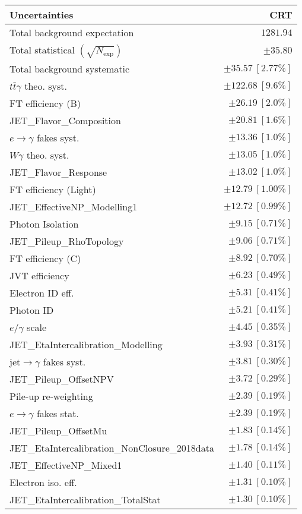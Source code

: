 \begin{tabular}{lr}
\hline
\textbf{Uncertainties} & \textbf{CRT} \\
\hline
Total background expectation & $1281.94$ \\
\hline
Total statistical $(\sqrt{N_\mathrm{exp}})$ & $\pm 35.80$ \\
Total background systematic & $\pm 35.57\ [2.77\%]$ \\
\hline
\hline
$t\bar{t}\gamma$ theo. syst. & $\pm 122.68\ [9.6\%]$ \\
FT efficiency (B) & $\pm 26.19\ [2.0\%]$ \\
JET\_Flavor\_Composition & $\pm 20.81\ [1.6\%]$ \\
$e\to\gamma$ fakes syst. & $\pm 13.36\ [1.0\%]$ \\
$W\gamma$ theo. syst. & $\pm 13.05\ [1.0\%]$ \\
JET\_Flavor\_Response & $\pm 13.02\ [1.0\%]$ \\
FT efficiency (Light) & $\pm 12.79\ [1.00\%]$ \\
JET\_EffectiveNP\_Modelling1 & $\pm 12.72\ [0.99\%]$ \\
Photon Isolation & $\pm 9.15\ [0.71\%]$ \\
JET\_Pileup\_RhoTopology & $\pm 9.06\ [0.71\%]$ \\
FT efficiency (C) & $\pm 8.92\ [0.70\%]$ \\
JVT efficiency & $\pm 6.23\ [0.49\%]$ \\
Electron ID eff. & $\pm 5.31\ [0.41\%]$ \\
Photon ID & $\pm 5.21\ [0.41\%]$ \\
$e/\gamma$ scale & $\pm 4.45\ [0.35\%]$ \\
JET\_EtaIntercalibration\_Modelling & $\pm 3.93\ [0.31\%]$ \\
jet$\to\gamma$ fakes syst. & $\pm 3.81\ [0.30\%]$ \\
JET\_Pileup\_OffsetNPV & $\pm 3.72\ [0.29\%]$ \\
Pile-up re-weighting & $\pm 2.39\ [0.19\%]$ \\
$e\to\gamma$ fakes stat. & $\pm 2.39\ [0.19\%]$ \\
JET\_Pileup\_OffsetMu & $\pm 1.83\ [0.14\%]$ \\
JET\_EtaIntercalibration\_NonClosure\_2018data & $\pm 1.78\ [0.14\%]$ \\
JET\_EffectiveNP\_Mixed1 & $\pm 1.40\ [0.11\%]$ \\
Electron iso. eff. & $\pm 1.31\ [0.10\%]$ \\
JET\_EtaIntercalibration\_TotalStat & $\pm 1.30\ [0.10\%]$ \\

\end{tabular}
